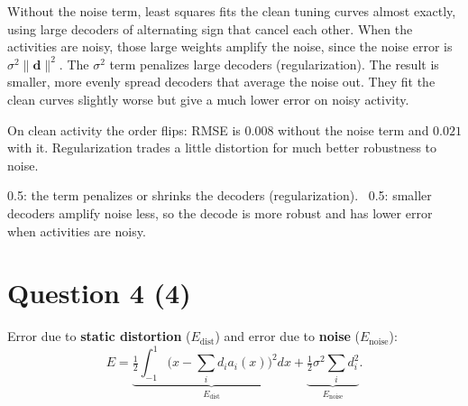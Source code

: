 \documentclass[11pt,letterpaper]{article}
\newcommand{\ans}[1]{\par\vspace{4pt}{\bfseries #1}\quad}
\begin{document}
\ans{(c) [1]}
Without the noise term, least squares fits the clean tuning curves almost exactly, using large decoders of alternating sign that cancel each other. When the activities are noisy, those large weights amplify the noise, since the noise error is $\sigma^2\|\mathbf d\|^2$. The $\sigma^2$ term penalizes large decoders (regularization). The result is smaller, more evenly spread decoders that average the noise out. They fit the clean curves slightly worse but give a much lower error on noisy activity.
\begin{center}
\end{center}
On clean activity the order flips: RMSE is $0.008$ without the noise term and $0.021$ with it. Regularization trades a little distortion for much better robustness to noise.
\begin{marking}
0.5: the term penalizes or shrinks the decoders (regularization). \ 0.5: smaller decoders amplify noise less, so the decode is more robust and has lower error when activities are noisy.
\end{marking}

\section*{Question 4 \hfill (4)}

\ans{(a) [1]}
Error due to \textbf{static distortion} ($E_{\mathrm{dist}}$) and error due to \textbf{noise} ($E_{\mathrm{noise}}$):
\[
E = \underbrace{\tfrac12\int_{-1}^{1}\bigl(x - \textstyle\sum_i d_i a_i(x)\bigr)^2 dx}_{E_{\mathrm{dist}}} + \underbrace{\tfrac12\sigma^2\textstyle\sum_i d_i^2}_{E_{\mathrm{noise}}}.
\]
\end{document}

